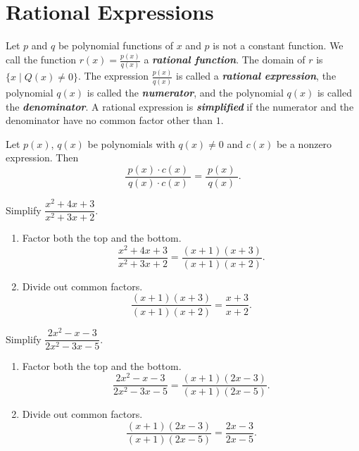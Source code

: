 \documentclass[en,12pt]{elegantbook}
\let\BeginKnitrBlock\begin \let\EndKnitrBlock\end
\begin{document}
\hypertarget{rational-expressions}{%
\section{Rational Expressions}\label{rational-expressions}}

Let \(p\) and \(q\) be polynomial functions of \(x\) and \(p\) is not a constant function. We call the function \(r(x)=\frac{p(x)}{q(x)}\) a \textbf{\emph{rational function}}. The domain of \(r\) is \(\{x\mid Q(x)\neq 0\}\).
The expression \(\frac{p(x)}{q(x)}\) is called a \textbf{\emph{rational expression}}, the polynomial \(q(x)\) is called the \textbf{\emph{numerator}}, and the polynomial \(q(x)\) is called the \textbf{\emph{denominator}}.
A rational expression is \textbf{\emph{simplified}} if the numerator and the denominator have no common factor other than \(1\).

Let \(p(x)\), \(q(x)\) be polynomials with \(q(x)\neq 0\) and \(c(x)\) be a nonzero expression. Then
\[
\dfrac{~p(x)\cdot c(x)~}{~q(x)\cdot c(x)~}=\dfrac{~p(x)~}{~q(x)~}.
\]

\BeginKnitrBlock{example}
\protect\hypertarget{exm:unnamed-chunk-32}{}{\label{exm:unnamed-chunk-32} }
Simplify \(\dfrac{x^2+4x+3}{x^2+3x+2}\).
\EndKnitrBlock{example}

\BeginKnitrBlock{solution}


\begin{enumerate}
\def\labelenumi{\arabic{enumi}.}
\item
  Factor both the top and the bottom.
  \[
   \dfrac{x^2+4x+3}{x^2+3x+2}=\dfrac{(x+1)(x+3)}{(x+1)(x+2)}.
  \]
\item
  Divide out common factors.
  \[
   \dfrac{(x+1)(x+3)}{(x+1)(x+2)}=\dfrac{x+3}{x+2}.
  \]
\end{enumerate}
\EndKnitrBlock{solution}

\BeginKnitrBlock{example}
\protect\hypertarget{exm:unnamed-chunk-34}{}{\label{exm:unnamed-chunk-34} }
Simplify \(\dfrac{2x^2-x-3}{2x^2-3x-5}\).
\EndKnitrBlock{example}

\BeginKnitrBlock{solution}


\begin{enumerate}
\def\labelenumi{\arabic{enumi}.}
\item
  Factor both the top and the bottom.
  \[\dfrac{2x^2-x-3}{2x^2-3x-5}=\dfrac{(x+1)(2x-3)}{(x+1)(2x-5)}.\]
\item
  Divide out common factors.
  \[\dfrac{(x+1)(2x-3)}{(x+1)(2x-5)}=\dfrac{2x-3}{2x-5}.\]
\end{enumerate}
\EndKnitrBlock{solution}
\end{document}
